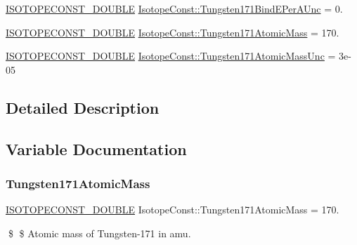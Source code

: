 \begin{DoxyCompactItemize}
\mbox{\hyperlink{group___isotope_const-_macros_ga8f45a7272ce02c0b4c65c44636ed719a}{I\+S\+O\+T\+O\+P\+E\+C\+O\+N\+S\+T\+\_\+\+D\+O\+U\+B\+LE}} \mbox{\hyperlink{group___isotope_const-_tungsten-_w171_ga1d3f10ca335a70f785c636e422f06215}{Isotope\+Const\+::\+Tungsten171\+Bind\+E\+Per\+A\+Unc}} = 0.
\item 
\mbox{\hyperlink{group___isotope_const-_macros_ga8f45a7272ce02c0b4c65c44636ed719a}{I\+S\+O\+T\+O\+P\+E\+C\+O\+N\+S\+T\+\_\+\+D\+O\+U\+B\+LE}} \mbox{\hyperlink{group___isotope_const-_tungsten-_w171_ga35d17c65c3d93c30d505a9eb7ea58b39}{Isotope\+Const\+::\+Tungsten171\+Atomic\+Mass}} = 170.
\item 
\mbox{\hyperlink{group___isotope_const-_macros_ga8f45a7272ce02c0b4c65c44636ed719a}{I\+S\+O\+T\+O\+P\+E\+C\+O\+N\+S\+T\+\_\+\+D\+O\+U\+B\+LE}} \mbox{\hyperlink{group___isotope_const-_tungsten-_w171_gada42612b31f5f05566ccea41dd9b54e4}{Isotope\+Const\+::\+Tungsten171\+Atomic\+Mass\+Unc}} = 3e-\/05
\end{DoxyCompactItemize}


\subsection{Detailed Description}


\subsection{Variable Documentation}
\mbox{\label{group___isotope_const-_tungsten-_w171_ga35d17c65c3d93c30d505a9eb7ea58b39}} 
\subsubsection{\texorpdfstring{Tungsten171\+Atomic\+Mass}{Tungsten171AtomicMass}}
{\footnotesize\ttfamily \mbox{\hyperlink{group___isotope_const-_macros_ga8f45a7272ce02c0b4c65c44636ed719a}{I\+S\+O\+T\+O\+P\+E\+C\+O\+N\+S\+T\+\_\+\+D\+O\+U\+B\+LE}} Isotope\+Const\+::\+Tungsten171\+Atomic\+Mass = 170.}

\$ \$ Atomic mass of Tungsten-\/171 in amu. \mbox{\label{group___isotope_const-_tungsten-_w171_gada42612b31f5f05566ccea41dd9b54e4}} 
